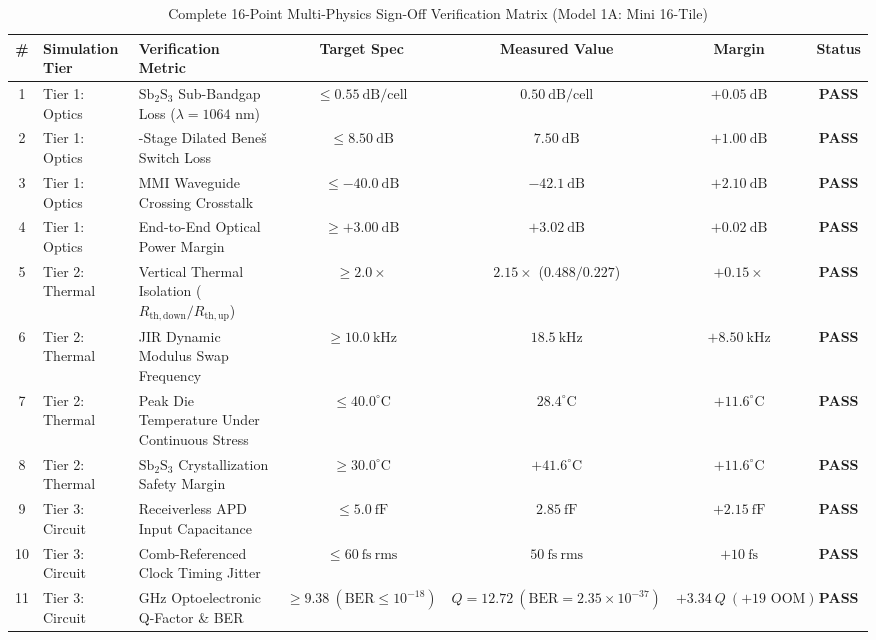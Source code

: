 \documentclass[journal]{IEEEtran}
\begin{document}
\begin{table}[!htbp]
\centering
\footnotesize
\setlength{\tabcolsep}{3.5pt}
\caption{Complete 16-Point Multi-Physics Sign-Off Verification Matrix (Model 1A: Mini 16-Tile)}
\label{tab:signoff_matrix}
\begin{tabularx}{\textwidth}{c l >{\raggedright\arraybackslash}X c c c c}
\toprule
\textbf{\#} & \textbf{Simulation Tier} & \textbf{Verification Metric} & \textbf{Target Spec} & \textbf{Measured Value} & \textbf{Margin} & \textbf{Status} \\
\midrule
1 & Tier 1: Optics & $\mathrm{Sb_2S_3}$ Sub-Bandgap Loss ($\lambda=1064\text{ nm}$) & $\le 0.55~\mathrm{dB/cell}$ & $0.50~\mathrm{dB/cell}$ & $+0.05~\mathrm{dB}$ & \textbf{PASS} \\
2 & Tier 1: Optics & 15-Stage Dilated Bene\v{s} Switch Loss & $\le 8.50~\mathrm{dB}$ & $7.50~\mathrm{dB}$ & $+1.00~\mathrm{dB}$ & \textbf{PASS} \\
3 & Tier 1: Optics & MMI Waveguide Crossing Crosstalk & $\le -40.0~\mathrm{dB}$ & $-42.1~\mathrm{dB}$ & $+2.10~\mathrm{dB}$ & \textbf{PASS} \\
4 & Tier 1: Optics & End-to-End Optical Power Margin & $\ge +3.00~\mathrm{dB}$ & $+3.02~\mathrm{dB}$ & $+0.02~\mathrm{dB}$ & \textbf{PASS} \\
\midrule
5 & Tier 2: Thermal & Vertical Thermal Isolation ($R_{\mathrm{th,down}} / R_{\mathrm{th,up}}$) & $\ge 2.0\times$ & $2.15\times$ ($0.488 / 0.227$) & $+0.15\times$ & \textbf{PASS} \\
6 & Tier 2: Thermal & JIR Dynamic Modulus Swap Frequency & $\ge 10.0~\mathrm{kHz}$ & $18.5~\mathrm{kHz}$ & $+8.50~\mathrm{kHz}$ & \textbf{PASS} \\
7 & Tier 2: Thermal & Peak Die Temperature Under Continuous Stress & $\le 40.0^\circ\mathrm{C}$ & $28.4^\circ\mathrm{C}$ & $+11.6^\circ\mathrm{C}$ & \textbf{PASS} \\
8 & Tier 2: Thermal & $\mathrm{Sb_2S_3}$ Crystallization Safety Margin & $\ge 30.0^\circ\mathrm{C}$ & $+41.6^\circ\mathrm{C}$ & $+11.6^\circ\mathrm{C}$ & \textbf{PASS} \\
\midrule
9 & Tier 3: Circuit & Receiverless APD Input Capacitance & $\le 5.0~\mathrm{fF}$ & $2.85~\mathrm{fF}$ & $+2.15~\mathrm{fF}$ & \textbf{PASS} \\
10 & Tier 3: Circuit & Comb-Referenced Clock Timing Jitter & $\le 60~\mathrm{fs~rms}$ & $50~\mathrm{fs~rms}$ & $+10~\mathrm{fs}$ & \textbf{PASS} \\
11 & Tier 3: Circuit & 100 GHz Optoelectronic Q-Factor \& BER & $\ge 9.38~(\mathrm{BER} \le 10^{-18})$ & $Q=12.72~(\mathrm{BER}=2.35\times 10^{-37})$ & $+3.34~Q~(+\text{19 OOM})$ & \textbf{PASS} \\

\end{tabularx}
\end{table}
\end{document}
